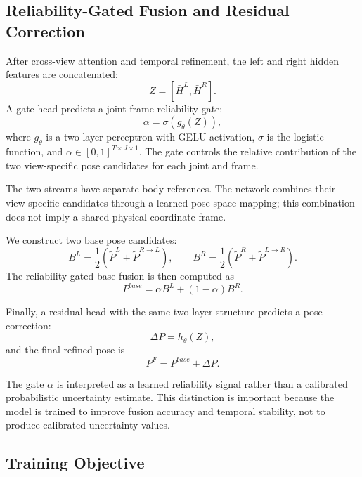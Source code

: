 \documentclass[preprint,12pt]{elsarticle}
\begin{document}
\subsection{Reliability-Gated Fusion and Residual Correction}
\label{subsec:reliability_fusion}

After cross-view attention and temporal refinement, the left and right hidden features are concatenated:
\[
Z = [\bar{H}^{L}, \bar{H}^{R}].
\]
A gate head predicts a joint-frame reliability gate:
\[
\alpha = \sigma(g_{\theta}(Z)),
\]
where \(g_{\theta}\) is a two-layer perceptron with GELU activation, \(\sigma\) is the logistic function, and \(\alpha \in [0,1]^{T \times J \times 1}\). The gate controls the relative contribution of the two view-specific pose candidates for each joint and frame.

The two streams have separate body references. The network combines their view-specific candidates through a learned pose-space mapping; this combination does not imply a shared physical coordinate frame.

We construct two base pose candidates:
\[
B^{L} = \frac{1}{2}(\tilde{P}^{L} + \tilde{P}^{R \rightarrow L}),
\qquad
B^{R} = \frac{1}{2}(\tilde{P}^{R} + \tilde{P}^{L \rightarrow R}).
\]
The reliability-gated base fusion is then computed as
\[
P^{base}
=
\alpha B^{L}
+
(1-\alpha)B^{R}.
\]

Finally, a residual head with the same two-layer structure predicts a pose correction:
\[
\Delta P = h_{\theta}(Z),
\]
and the final refined pose is
\[
P^{F} = P^{base} + \Delta P.
\]

The gate \(\alpha\) is interpreted as a learned reliability signal rather than a calibrated probabilistic uncertainty estimate. This distinction is important because the model is trained to improve fusion accuracy and temporal stability, not to produce calibrated uncertainty values.

\subsection{Training Objective}
\label{subsec:training_objective}
\end{document}
